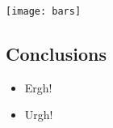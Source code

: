 \documentclass[final, finnished, monochromatic]{jyuposter}
\begin{document}
\begin{multicols}
\bigskip
\noindent
\texttt{[image: bars]}

\bigskip
\noindent
\begin{tcolorbox}
\section*{Conclusions}

\begin{itemize}
  \item Ergh!
  \item Urgh!
\end{itemize}
\end{tcolorbox}

\nocite{*}

\printbibliography

\end{multicols}
\end{document}
